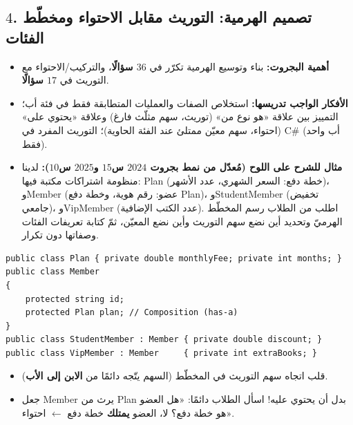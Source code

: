\documentclass[14pt]{extarticle}
\begin{document}
\subsection*{$4$. تصميم الهرمية: التوريث مقابل الاحتواء ومخطّط الفئات}
\begin{itemize}[itemsep=0.25em]
    \item \textbf{أهمية البجروت:} بناء وتوسيع الهرمية تكرّر في \textbf{$36$ سؤالًا}، والتركيب/الاحتواء مع التوريث في \textbf{$17$ سؤالًا}.
    \item \textbf{الأفكار الواجب تدريسها:} استخلاص الصفات والعمليات المتطابقة فقط في فئة أب؛ التمييز بين علاقة «هو نوع من» (توريث، سهم مثلّث فارغ) وعلاقة «يحتوي على» (احتواء، سهم معيّن ممتلئ عند الفئة الحاوية)؛ التوريث المفرد في \textenglish{C\#} (أب واحد فقط).
    \item \textbf{مثال للشرح على اللوح (مُعدّل من نمط بجروت $2024$ س$15$ و$2025$ س$10$):}
    لدينا منظومة اشتراكات مكتبة فيها: \textenglish{Plan} (خطة دفع: السعر الشهري، عدد الأشهر)، و\textenglish{Member} (عضو: رقم هوية، وخطة دفع \textenglish{Plan})، و\textenglish{StudentMember} (تخفيض جامعي)، و\textenglish{VipMember} (عدد الكتب الإضافية). اطلب من الطلاب رسم المخطّط الهرميّ وتحديد أين نضع سهم التوريث وأين نضع المعيّن، ثمّ كتابة تعريفات الفئات وصفاتها دون تكرار.
\end{itemize}
\begin{boxCode}
\begin{english}
\begin{verbatim}
public class Plan { private double monthlyFee; private int months; }
public class Member
{
    protected string id;
    protected Plan plan; // Composition (has-a)
}
public class StudentMember : Member { private double discount; }
public class VipMember : Member     { private int extraBooks; }
\end{verbatim}
\end{english}
\end{boxCode}
\begin{boxWarning}
\begin{itemize}
    \item قلب اتجاه سهم التوريث في المخطّط (السهم يتّجه دائمًا من \textbf{الابن إلى الأب}).
    \item جعل \textenglish{Member} يرث من \textenglish{Plan} بدل أن يحتوي عليه! اسأل الطلاب دائمًا: «هل العضو هو خطة دفع؟ لا، العضو \textbf{يمتلك} خطة دفع $\leftarrow$ احتواء».
\end{itemize}
\end{boxWarning}
\end{document}
